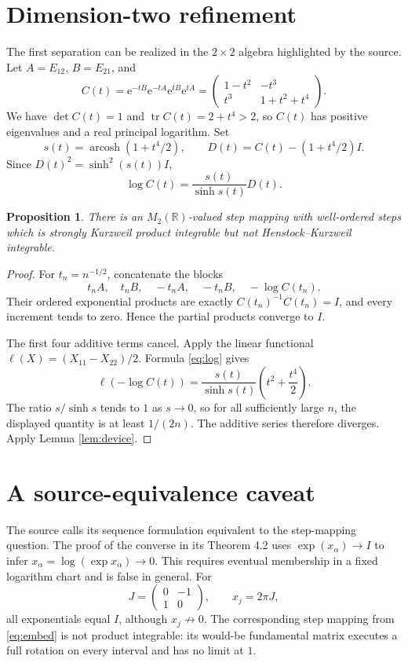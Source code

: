 \documentclass[10pt,a4paper]{article}
\newtheorem{proposition}[theorem]{Proposition}
\newcommand{\R}{\mathbb R}
\newcommand{\e}{\mathrm e}
\newcommand{\Id}{I}
\newcommand{\tr}{\operatorname{tr}}
\begin{document}
\section{Dimension-two refinement}

The first separation can be realized in the \(2\times2\) algebra highlighted
by the source.  Let \(A=E_{12}\), \(B=E_{21}\), and
\[
 C(t)=\e^{-tB}\e^{-tA}\e^{tB}\e^{tA}
 =\begin{pmatrix}1-t^2&-t^3\\ t^3&1+t^2+t^4\end{pmatrix}.
\]
We have \(\det C(t)=1\) and \(\tr C(t)=2+t^4>2\), so \(C(t)\) has positive
eigenvalues and a real principal logarithm.  Set
\[
 s(t)=\operatorname{arcosh}(1+t^4/2),\qquad
 D(t)=C(t)-(1+t^4/2)\Id.
\]
Since \(D(t)^2=\sinh^2(s(t))\Id\),
\begin{equation}\label{eq:log}
 \log C(t)=\frac{s(t)}{\sinh s(t)}D(t).
\end{equation}

\begin{proposition}\label{prop:m2}
There is an \(M_2(\R)\)-valued step mapping with well-ordered steps which is
strongly Kurzweil product integrable but not Henstock--Kurzweil integrable.
\end{proposition}

\begin{proof}
For \(t_n=n^{-1/2}\), concatenate the blocks
\[
 t_nA,\quad t_nB,\quad -t_nA,\quad -t_nB,
 \quad -\log C(t_n).
\]
Their ordered exponential products are exactly \(C(t_n)^{-1}C(t_n)=\Id\),
and every increment tends to zero.  Hence the partial products converge to
\(\Id\).

The first four additive terms cancel.  Apply the linear functional
\(\ell(X)=(X_{11}-X_{22})/2\).  Formula \eqref{eq:log} gives
\[
 \ell(-\log C(t))=
 \frac{s(t)}{\sinh s(t)}\left(t^2+\frac{t^4}{2}\right).
\]
The ratio \(s/\sinh s\) tends to \(1\) as \(s\to0\), so for all sufficiently
large \(n\), the displayed quantity is at least \(1/(2n)\).  The additive
series therefore diverges.  Apply Lemma \ref{lem:device}.
\end{proof}

\section{A source-equivalence caveat}

The source calls its sequence formulation equivalent to the step-mapping
question.  The proof of the converse in its Theorem 4.2 uses
\(\exp(x_\alpha)\to\Id\) to infer
\(x_\alpha=\log(\exp x_\alpha)\to0\).  This requires eventual membership in a
fixed logarithm chart and is false in general.  For
\[
 J=\begin{pmatrix}0&-1\\1&0\end{pmatrix},\qquad x_j=2\pi J,
\]
all exponentials equal \(\Id\), although \(x_j\not\to0\).  The corresponding
step mapping from \eqref{eq:embed} is not product integrable: its would-be
fundamental matrix executes a full rotation on every interval and has no limit
at \(1\).
\end{document}
